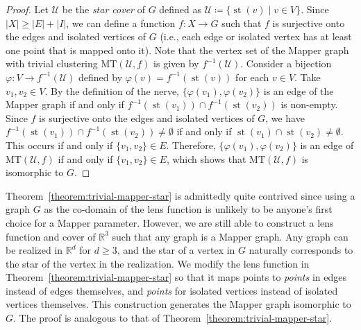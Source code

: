 \documentclass[reqno,oneside,11pt]{amsart}
\theoremstyle{definition}
\theoremstyle{remark}
\newcommand{\MT}{\text{MT}}
\def\R{\mathbb{R}}
\begin{document}
\begin{proof}
Let $\mathcal{U}$ be the {\it star cover} of $G$ defined as $\mathcal{U}\coloneq\{\operatorname{st}(v) \mid v \in V\}$. Since $|X| \geq |E|+|I|$, we can define a function $f \colon X \to G$ such that $f$ is surjective onto the edges and isolated vertices of $G$ (i.e., each edge or isolated vertex has at least one point that is mapped onto it). Note that the vertex set of the Mapper graph with trivial clustering $\MT(\mathcal{U}, f)$ is given by $f^{-1}(\mathcal{U})$. Consider a bijection $\varphi \colon V \to f^{-1}(\mathcal{U})$ defined by $\varphi(v)=f^{-1}(\operatorname{st}(v))$ for each $v \in V$. Take $v_1, v_2 \in V$. By the definition of the nerve,
 $\{\varphi(v_1),\varphi(v_2)\}$ is an edge of the Mapper graph if and only if $f^{-1}(\operatorname{st}(v_1)) \cap f^{-1}(\operatorname{st}(v_2))$ is non-empty.
 Since $f$ is surjective onto the edges and isolated vertices of $G$, we have $f^{-1}(\operatorname{st}(v_1)) \cap f^{-1}(\operatorname{st}(v_2)) \neq \emptyset$ if and only if  $\operatorname{st}(v_1) \cap \operatorname{st}(v_2) \neq \emptyset$. This occurs if  and only if $\{v_1,v_2\} \in E$. Therefore, $\{\varphi(v_1),\varphi(v_2)\}$ is an edge of $\MT(\mathcal{U}, f)$ if and only if
 $\{v_1,v_2\} \in E$, which shows that $\MT(\mathcal{U}, f)$ is isomorphic to $G$. 
\end{proof}

Theorem~\ref{theorem:trivial-mapper-star} is admittedly quite contrived since using a graph $G$ as the co-domain of the lens function is unlikely to be anyone's first choice for a Mapper parameter. However, we are still able to construct a lens function and cover of $\R^3$ such that any graph is a Mapper graph. Any graph can be realized in $\mathbb{R}^d$ for $d\geq 3$, and the star of a vertex in $G$ naturally corresponds to the star of the vertex in the realization. We modify the lens function in Theorem~\ref{theorem:trivial-mapper-star} so that it maps points to \emph{points} in edges instead of edges themselves, and \emph{points} for isolated vertices instead of isolated vertices themselves. This construction generates the Mapper graph isomorphic to $G$. The proof is analogous to that of Theorem~\ref{theorem:trivial-mapper-star}.

%
\end{document}
